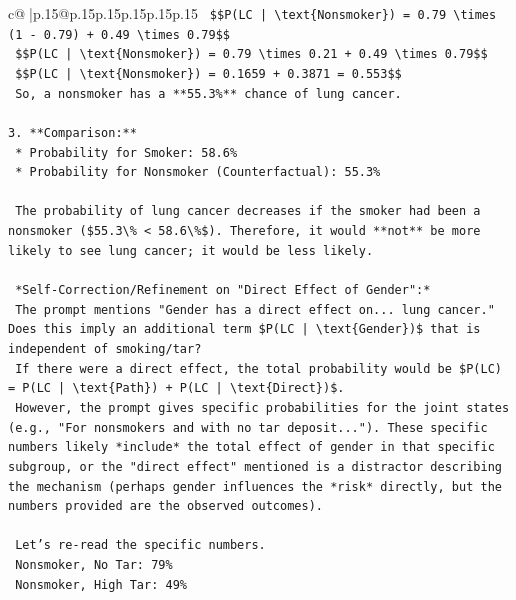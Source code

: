 \documentclass{article}
\begin{document}
{\begin{supertabular}{c@{$\;$}|p{.15\linewidth}@{}p{.15\linewidth}p{.15\linewidth}p{.15\linewidth}p{.15\linewidth}p{.15\linewidth}}
{{{\texttt{        \$\$P(LC | \textbackslash{}text\{Nonsmoker\}) = 0.79 \textbackslash{}times (1 {-} 0.79) + 0.49 \textbackslash{}times 0.79\$\$} \\
\texttt{        \$\$P(LC | \textbackslash{}text\{Nonsmoker\}) = 0.79 \textbackslash{}times 0.21 + 0.49 \textbackslash{}times 0.79\$\$} \\
\texttt{        \$\$P(LC | \textbackslash{}text\{Nonsmoker\}) = 0.1659 + 0.3871 = 0.553\$\$} \\
\texttt{        So, a nonsmoker has a **55.3\%** chance of lung cancer.} \\
\\ 
\texttt{3.  **Comparison:**} \\
\texttt{    *   Probability for Smoker: 58.6\%} \\
\texttt{    *   Probability for Nonsmoker (Counterfactual): 55.3\%} \\
\\ 
\texttt{    The probability of lung cancer decreases if the smoker had been a nonsmoker (\$55.3\textbackslash{}\% < 58.6\textbackslash{}\%\$). Therefore, it would **not** be more likely to see lung cancer; it would be less likely.} \\
\\ 
\texttt{    *Self{-}Correction/Refinement on "Direct Effect of Gender":*} \\
\texttt{    The prompt mentions "Gender has a direct effect on... lung cancer." Does this imply an additional term \$P(LC | \textbackslash{}text\{Gender\})\$ that is independent of smoking/tar?} \\
\texttt{    If there were a direct effect, the total probability would be \$P(LC) = P(LC | \textbackslash{}text\{Path\}) + P(LC | \textbackslash{}text\{Direct\})\$.} \\
\texttt{    However, the prompt gives specific probabilities for the joint states (e.g., "For nonsmokers and with no tar deposit..."). These specific numbers likely *include* the total effect of gender in that specific subgroup, or the "direct effect" mentioned is a distractor describing the mechanism (perhaps gender influences the *risk* directly, but the numbers provided are the observed outcomes).} \\
\\ 
\texttt{    Let's re{-}read the specific numbers.} \\
\texttt{    Nonsmoker, No Tar: 79\%} \\
\texttt{    Nonsmoker, High Tar: 49\%} \\
}}}
\end{supertabular}}
\end{document}
